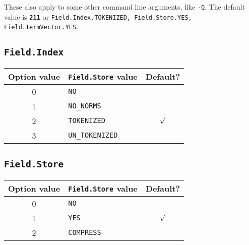 \label{parameters}
These also apply to some other command line arguments, like {\tt -Q}.
The default value is {\bfseries \tt 211} or {\tt Field.Index.TOKENIZED, Field.Store.YES, Field.TermVector.YES}.

\subsection{\tt Field.Index}

\begin{table}[h]
\begin{center}
\label{tableIndex}
\begin{tabular}{|c|l|c|}
\hline
\bfseries Option value & {\bfseries \tt Field.Store} value&Default?\bfseries \\ \hline \hline
        0&\tt NO & \\ \hline
        1&\tt NO\_NORMS& \\\hline
        2&\tt TOKENIZED& $\surd$\\\hline
        3&\tt UN\_TOKENIZED& \\\hline
\end{tabular}
\end{center}
\end{table}



\subsection{\tt Field.Store}
\begin{table}[h]
\begin{center}
\label{tableStore}
\begin{tabular}{|c|l|c|}
\hline
\bfseries Option value & {\bfseries \tt Field.Store} value&Default?\bfseries \\ \hline \hline
        0&\tt NO& \\ \hline
        1&\tt YES&$\surd$ \\ \hline
        2&\tt COMPRESS&\\ \hline
\end{tabular}
\end{center}
\end{table}






